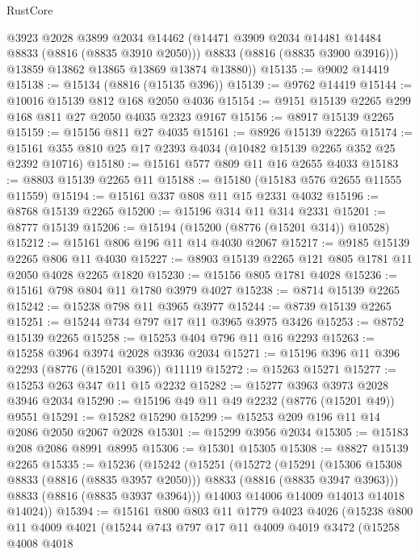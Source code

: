 \begin{lexlean}{RustCore}
\begin{coremodule}
          @3923
          @2028
          @3899
          @2034
          @14462
          (@14471 @3909 @2034 @14481 @14484 @8833 (@8816 (@8835 @3910 @2050)))
          @8833
          (@8816 (@8835 @3900 @3916)))
        @13859
        @13862
        @13865
        @13869
        @13874
        @13880))
@15135 := @9002 @14419
@15138 := @15134 (@8816 (@15135 @396))
@15139 := @9762 @14419
@15144 := @10016 @15139 @812 @168 @2050 @4036
@15154 := @9151 @15139 @2265 @299 @168 @811 @27 @2050 @4035 @2323 @9167
@15156 := @8917 @15139 @2265
@15159 := @15156 @811 @27 @4035
@15161 := @8926 @15139 @2265
@15174 := @15161 @355 @810 @25 @17 @2393 @4034 (@10482 @15139 @2265 @352 @25 @2392 @10716)
@15180 := @15161 @577 @809 @11 @16 @2655 @4033
@15183 := @8803 @15139 @2265 @11
@15188 := @15180 (@15183 @576 @2655 @11555 @11559)
@15194 := @15161 @337 @808 @11 @15 @2331 @4032
@15196 := @8768 @15139 @2265
@15200 := @15196 @314 @11 @314 @2331
@15201 := @8777 @15139
@15206 := @15194 (@15200 (@8776 (@15201 @314)) @10528)
@15212 := @15161 @806 @196 @11 @14 @4030 @2067
@15217 := @9185 @15139 @2265 @806 @11 @4030
@15227 := @8903 @15139 @2265 @121 @805 @1781 @11 @2050 @4028 @2265 @1820
@15230 := @15156 @805 @1781 @4028
@15236 := @15161 @798 @804 @11 @1780 @3979 @4027
@15238 := @8714 @15139 @2265
@15242 := @15238 @798 @11 @3965 @3977
@15244 := @8739 @15139 @2265
@15251 := @15244 @734 @797 @17 @11 @3965 @3975 @3426
@15253 := @8752 @15139 @2265
@15258 := @15253 @404 @796 @11 @16 @2293
@15263 := @15258 @3964 @3974 @2028 @3936 @2034
@15271 := @15196 @396 @11 @396 @2293 (@8776 (@15201 @396)) @11119
@15272 := @15263 @15271
@15277 := @15253 @263 @347 @11 @15 @2232
@15282 := @15277 @3963 @3973 @2028 @3946 @2034
@15290 := @15196 @49 @11 @49 @2232 (@8776 (@15201 @49)) @9551
@15291 := @15282 @15290
@15299 := @15253 @209 @196 @11 @14 @2086 @2050 @2067 @2028
@15301 := @15299 @3956 @2034
@15305 := @15183 @208 @2086 @8991 @8995
@15306 := @15301 @15305
@15308 := @8827 @15139 @2265
@15335 := @15236
    (@15242
      (@15251
        (@15272
          (@15291
            (@15306 @15308 @8833 (@8816 (@8835 @3957 @2050)))
            @8833
            (@8816 (@8835 @3947 @3963)))
          @8833
          (@8816 (@8835 @3937 @3964)))
        @14003
        @14006
        @14009
        @14013
        @14018
        @14024))
@15394 := @15161
    @800
    @803
    @11
    @1779
    @4023
    @4026
    (@15238
      @800
      @11
      @4009
      @4021
      (@15244
        @743
        @797
        @17
        @11
        @4009
        @4019
        @3472
        (@15258
          @4008
          @4018

\end{coremodule}
\end{lexlean}
